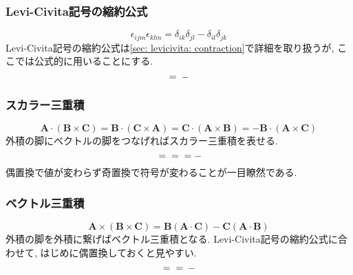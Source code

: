 \documentclass[dvipdfmx]{jsarticle}
\begin{document}
\subsubsection{Levi-Civita記号の縮約公式}
\label{sec: levi-civita contraction for vectors}

\begin{equation*}
    \epsilon_{ijm}\epsilon_{klm}
    =
    \delta_{ik}\delta_{jl}
    -
    \delta_{il}\delta_{jk}
\end{equation*}
Levi-Civita記号の縮約公式は\ref{sec: levicivita: contraction}で詳細を取り扱うが, ここでは公式的に用いることにする.
\begin{equation*}
    \vcenter{\hbox{}}
    =
    \vcenter{\hbox{}}
    -
    \vcenter{\hbox{}}
\end{equation*}


\subsubsection{スカラー三重積}

\begin{equation*}
    \bm{A}\cdot(\bm{B}\times\bm{C})
    =
    \bm{B}\cdot(\bm{C}\times\bm{A})
    =
    \bm{C}\cdot(\bm{A}\times\bm{B})
    =
    -
    \bm{B}\cdot(\bm{A}\times\bm{C})
\end{equation*}
外積の脚にベクトルの脚をつなげればスカラー三重積を表せる.
\begin{equation*}
    \vcenter{\hbox{}}
    =
    \vcenter{\hbox{}}
    =
    \vcenter{\hbox{}}
    =
    -
    \vcenter{\hbox{}}
\end{equation*}
偶置換で値が変わらず奇置換で符号が変わることが一目瞭然である.


\subsubsection{ベクトル三重積}

\begin{equation*}
    \bm{A}\times(\bm{B}\times\bm{C})
    =
    \bm{B}(\bm{A\cdot C})
    -
    \bm{C}(\bm{A\cdot B})
\end{equation*}
外積の脚を外積に繋げばベクトル三重積となる.
Levi-Civita記号の縮約公式に合わせて, はじめに偶置換しておくと見やすい.
\begin{equation*}
    \vcenter{\hbox{}}
    =
    \vcenter{\hbox{}}
    =
    \vcenter{\hbox{}}
    -
    \vcenter{\hbox{}}
\end{equation*}
\end{document}
